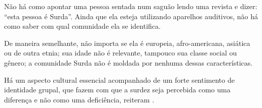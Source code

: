 \begin{citacao}
    Não há como apontar uma pessoa sentada num saguão lendo uma revista e dizer: ``esta pessoa é Surda''. Ainda que ela esteja utilizando aparelhos auditivos, não há como saber com qual comunidade ela se identifica.

    De maneira semelhante, não importa se ela é europeia, afro-americana, asiática ou de outra etnia; sua idade não é relevante, tampouco sua classe social ou gênero; a comunidade Surda não é moldada por nenhuma dessas características.~\cite[tradução nossa]{stewart-2021-barrons-asl}

\end{citacao}


Há um aspecto cultural essencial acompanhado de um forte sentimento de identidade grupal, que fazem com que a surdez seja percebida como uma diferença e não como uma deficiência, reiteram .






